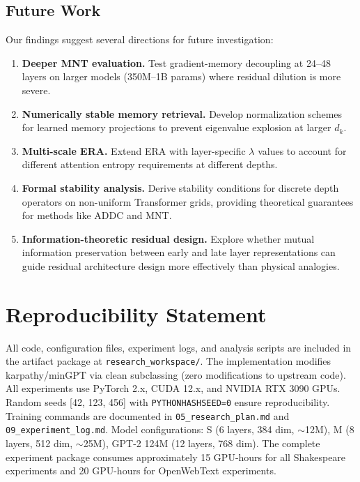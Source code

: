 \documentclass[10pt]{article}
\begin{document}
\subsection*{Future Work}

Our findings suggest several directions for future investigation:

\begin{enumerate}[leftmargin=*,itemsep=2pt]
    \item \textbf{Deeper MNT evaluation.} Test gradient-memory decoupling at 24--48 layers on larger models (350M--1B params) where residual dilution is more severe.
    \item \textbf{Numerically stable memory retrieval.} Develop normalization schemes for learned memory projections to prevent eigenvalue explosion at larger $d_k$.
    \item \textbf{Multi-scale ERA.} Extend ERA with layer-specific $\lambda$ values to account for different attention entropy requirements at different depths.
    \item \textbf{Formal stability analysis.} Derive stability conditions for discrete depth operators on non-uniform Transformer grids, providing theoretical guarantees for methods like ADDC and MNT.
    \item \textbf{Information-theoretic residual design.} Explore whether mutual information preservation between early and late layer representations can guide residual architecture design more effectively than physical analogies.
\end{enumerate}

\section*{Reproducibility Statement}

All code, configuration files, experiment logs, and analysis scripts are included in the artifact package at \texttt{research\_workspace/}. The implementation modifies karpathy/minGPT via clean subclassing (zero modifications to upstream code). All experiments use PyTorch 2.x, CUDA 12.x, and NVIDIA RTX 3090 GPUs. Random seeds [42, 123, 456] with \texttt{PYTHONHASHSEED=0} ensure reproducibility. Training commands are documented in \texttt{05\_research\_plan.md} and \texttt{09\_experiment\_log.md}. Model configurations: S (6 layers, 384 dim, ${\sim}$12M), M (8 layers, 512 dim, ${\sim}$25M), GPT-2 124M (12 layers, 768 dim). The complete experiment package consumes approximately 15 GPU-hours for all Shakespeare experiments and 20 GPU-hours for OpenWebText experiments.
\end{document}
